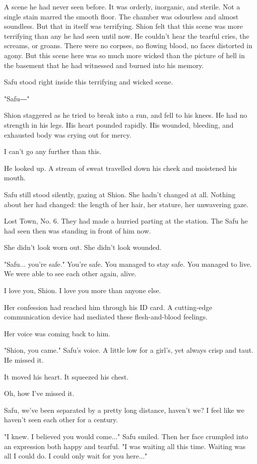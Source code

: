 A scene he had never seen before. It was orderly, inorganic, and
sterile. Not a single stain marred the smooth floor. The chamber was
odourless and almost soundless. But that in itself was terrifying. Shion
felt that this scene was more terrifying than any he had seen until now.
He couldn't hear the tearful cries, the screams, or groans. There were
no corpses, no flowing blood, no faces distorted in agony. But this
scene here was so much more wicked than the picture of hell in the
basement that he had witnessed and burned into his memory.

Safu stood right inside this terrifying and wicked scene.

"Safu―"

Shion staggered as he tried to break into a run, and fell to his knees.
He had no strength in his legs. His heart pounded rapidly. His wounded,
bleeding, and exhausted body was crying out for mercy.

I can't go any further than this.

He looked up. A stream of sweat travelled down his cheek and moistened
his mouth.

Safu still stood silently, gazing at Shion. She hadn't changed at all.
Nothing about her had changed: the length of her hair, her stature, her
unwavering gaze.

Lost Town, No. 6. They had made a hurried parting at the station. The
Safu he had seen then was standing in front of him now.

She didn't look worn out. She didn't look wounded.

"Safu... you're safe." You're safe. You managed to stay safe. You
managed to live. We were able to see each other again, alive.

I love you, Shion. I love you more than anyone else.

Her confession had reached him through his ID card. A cutting-edge
communication device had mediated these flesh-and-blood feelings.

Her voice was coming back to him.

"Shion, you came." Safu's voice. A little low for a girl's, yet always
crisp and taut. He missed it.

It moved his heart. It squeezed his chest.

Oh, how I've missed it.

Safu, we've been separated by a pretty long distance, haven't we? I feel
like we haven't seen each other for a century.

"I knew. I believed you would come..." Safu smiled. Then her face
crumpled into an expression both happy and tearful. "I was waiting all
this time. Waiting was all I could do. I could only wait for you
here..."

